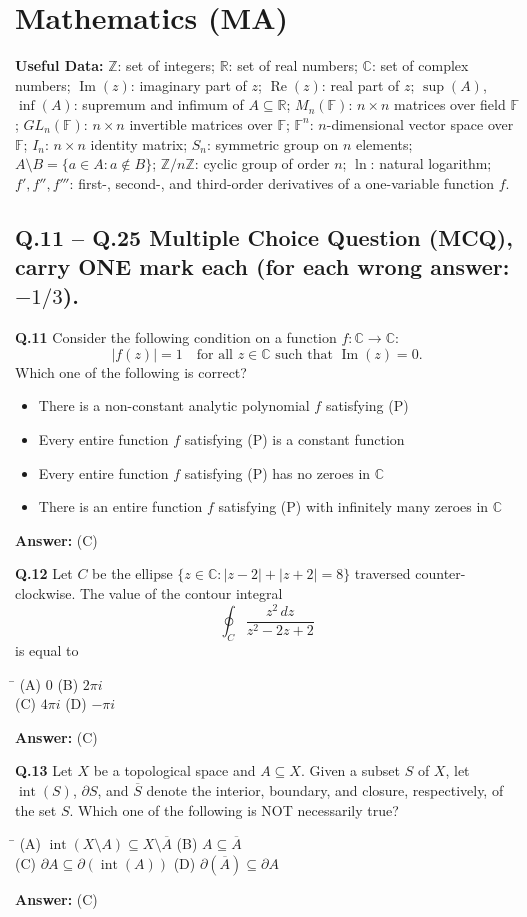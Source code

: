 \documentclass[11pt,a4paper]{article}
\newcommand{\optsfourA}[4]{%
  \begin{tabbing}
    \hspace{0.48\linewidth}\=\kill
    (A) #1 \> (B) #2 \\[2pt]
    (C) #3 \> (D) #4
  \end{tabbing}%
}
\newcommand{\optslistA}[4]{%
  \begin{itemize}
    \setlength{\itemsep}{2pt}\setlength{\parskip}{0pt}
    \item[(A)] #1
    \item[(B)] #2
    \item[(C)] #3
    \item[(D)] #4
  \end{itemize}%
}
\newcommand{\ans}[1]{\textbf{Answer:} #1\par\medskip}
\begin{document}
\section*{Mathematics (MA)}

\textbf{Useful Data:} $\mathbb{Z}$: set of integers; $\mathbb{R}$: set of real numbers; $\mathbb{C}$: set of complex numbers; $\operatorname{Im}(z)$: imaginary part of $z$; $\operatorname{Re}(z)$: real part of $z$; $\sup(A)$, $\inf(A)$: supremum and infimum of $A \subseteq \mathbb{R}$; $M_n(\mathbb{F})$: $n \times n$ matrices over field $\mathbb{F}$; $GL_n(\mathbb{F})$: $n \times n$ invertible matrices over $\mathbb{F}$; $\mathbb{F}^n$: $n$-dimensional vector space over $\mathbb{F}$; $I_n$: $n \times n$ identity matrix; $S_n$: symmetric group on $n$ elements; $A \setminus B = \{a \in A : a \notin B\}$; $\mathbb{Z}/n\mathbb{Z}$: cyclic group of order $n$; $\ln$: natural logarithm; $f', f'', f'''$: first-, second-, and third-order derivatives of a one-variable function $f$.

\subsection*{Q.11 -- Q.25 Multiple Choice Question (MCQ), carry ONE mark each (for each wrong answer: $-1/3$).}

\textbf{Q.11} Consider the following condition on a function $f : \mathbb{C} \to \mathbb{C}$:
\[
  |f(z)| = 1 \quad \text{for all } z \in \mathbb{C} \text{ such that } \operatorname{Im}(z) = 0. \tag{P}
\]
Which one of the following is correct?
\optslistA{There is a non-constant analytic polynomial $f$ satisfying (P)}{Every entire function $f$ satisfying (P) is a constant function}{Every entire function $f$ satisfying (P) has no zeroes in $\mathbb{C}$}{There is an entire function $f$ satisfying (P) with infinitely many zeroes in $\mathbb{C}$}
\ans{(C)}

\textbf{Q.12} Let $C$ be the ellipse $\{z \in \mathbb{C} : |z - 2| + |z + 2| = 8\}$ traversed counter-clockwise. The value of the contour integral
\[
  \oint_C \frac{z^2\,dz}{z^2 - 2z + 2}
\]
is equal to
\optsfourA{$0$}{$2\pi i$}{$4\pi i$}{$-\pi i$}
\ans{(C)}

\textbf{Q.13} Let $X$ be a topological space and $A \subseteq X$. Given a subset $S$ of $X$, let $\operatorname{int}(S)$, $\partial S$, and $\overline{S}$ denote the interior, boundary, and closure, respectively, of the set $S$. Which one of the following is NOT necessarily true?
\optsfourA{$\operatorname{int}(X \setminus A) \subseteq X \setminus \overline{A}$}{$A \subseteq \overline{A}$}{$\partial A \subseteq \partial(\operatorname{int}(A))$}{$\partial(\overline{A}) \subseteq \partial A$}
\ans{(C)}
\end{document}
